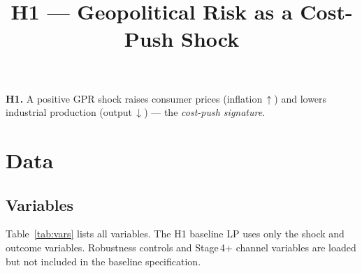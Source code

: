 \documentclass[11pt,a4paper]{article}
\title{\vspace{-1cm}\textbf{H1 --- Geopolitical Risk as a Cost-Push Shock}}
\date{}
\author{}
\begin{document}
\maketitle
\vspace{-1.5cm}

\begin{tcolorbox}[colback=gray!5, colframe=gray!30, arc=3pt, boxrule=1pt,
                   left=10pt, right=10pt, top=10pt, bottom=10pt]
\textbf{H1.} A positive GPR shock raises consumer prices (inflation\,$\uparrow$) and lowers industrial production (output\,$\downarrow$) --- the \emph{cost-push signature}.
\end{tcolorbox}

\section{Data}

\subsection{Variables}

Table~\ref{tab:vars} lists all variables. The H1 baseline LP uses only the shock and outcome variables. Robustness controls and Stage\,4+ channel variables are loaded but not included in the baseline specification.
\end{document}
